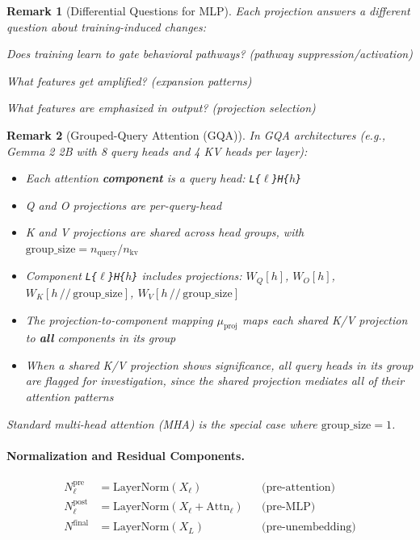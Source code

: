 \documentclass[11pt]{article}
\newtheorem{remark}{Remark}[section]
\begin{document}
\begin{remark}[Differential Questions for MLP]
\label{rem:differential-questions-mlp}
Each projection answers a different question about training-induced changes:
\begin{description}[nosep, leftmargin=1em]
\item[Gate:] Does training learn to gate behavioral pathways? (pathway suppression/activation)
\item[Up:] What features get amplified? (expansion patterns)
\item[Down:] What features are emphasized in output? (projection selection)
\end{description}
\end{remark}

\begin{remark}[Grouped-Query Attention (GQA)]
\label{rem:grouped-query-attention}
In GQA architectures (e.g., Gemma 2 2B with 8 query heads and 4 KV heads per layer):
\begin{itemize}[nosep]
\item Each attention \textbf{component} is a query head: \texttt{L\{$\ell$\}H\{$h$\}}
\item Q and O projections are per-query-head
\item K and V projections are shared across head groups, with $\text{group\_size} = n_{\text{query}} / n_{\text{kv}}$
\item Component \texttt{L\{$\ell$\}H\{$h$\}} includes projections: $W_Q[h]$, $W_O[h]$, $W_K[h \,//\, \text{group\_size}]$, $W_V[h \,//\, \text{group\_size}]$
\item The projection-to-component mapping $\mu_{\text{proj}}$ maps each shared K/V projection to \textbf{all} components in its group
\item When a shared K/V projection shows significance, all query heads in its group are flagged for investigation, since the shared projection mediates all of their attention patterns
\end{itemize}
Standard multi-head attention (MHA) is the special case where $\text{group\_size} = 1$.
\end{remark}

\paragraph{Normalization and Residual Components.}

\begin{align}
N^{\text{pre}}_\ell &= \text{LayerNorm}(X_\ell) & &\text{(pre-attention)} \\
N^{\text{post}}_\ell &= \text{LayerNorm}(X_\ell + \text{Attn}_\ell) & &\text{(pre-MLP)} \\
N^{\text{final}} &= \text{LayerNorm}(X_L) & &\text{(pre-unembedding)}
\end{align}
\end{document}
